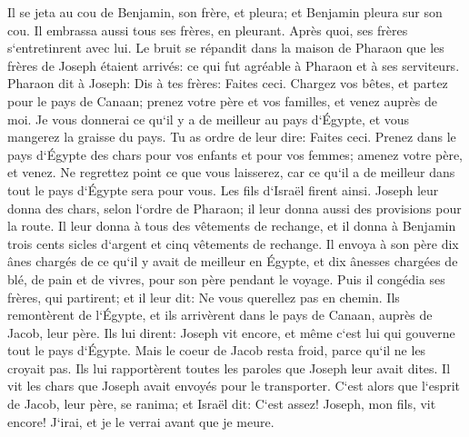 \verse Il se jeta au cou de Benjamin, son frère, et pleura; et Benjamin pleura sur son cou. 
\verse Il embrassa aussi tous ses frères, en pleurant. Après quoi, ses frères s`entretinrent avec lui. 
\verse Le bruit se répandit dans la maison de Pharaon que les frères de Joseph étaient arrivés: ce qui fut agréable à Pharaon et à ses serviteurs. 
\verse Pharaon dit à Joseph: Dis à tes frères: Faites ceci. Chargez vos bêtes, et partez pour le pays de Canaan; 
\verse prenez votre père et vos familles, et venez auprès de moi. Je vous donnerai ce qu`il y a de meilleur au pays d`Égypte, et vous mangerez la graisse du pays. 
\verse Tu as ordre de leur dire: Faites ceci. Prenez dans le pays d`Égypte des chars pour vos enfants et pour vos femmes; amenez votre père, et venez. 
\verse Ne regrettez point ce que vous laisserez, car ce qu`il a de meilleur dans tout le pays d`Égypte sera pour vous. 
\verse Les fils d`Israël firent ainsi. Joseph leur donna des chars, selon l`ordre de Pharaon; il leur donna aussi des provisions pour la route. 
\verse Il leur donna à tous des vêtements de rechange, et il donna à Benjamin trois cents sicles d`argent et cinq vêtements de rechange. 
\verse Il envoya à son père dix ânes chargés de ce qu`il y avait de meilleur en Égypte, et dix ânesses chargées de blé, de pain et de vivres, pour son père pendant le voyage. 
\verse Puis il congédia ses frères, qui partirent; et il leur dit: Ne vous querellez pas en chemin. 
\verse Ils remontèrent de l`Égypte, et ils arrivèrent dans le pays de Canaan, auprès de Jacob, leur père. 
\verse Ils lui dirent: Joseph vit encore, et même c`est lui qui gouverne tout le pays d`Égypte. Mais le coeur de Jacob resta froid, parce qu`il ne les croyait pas. 
\verse Ils lui rapportèrent toutes les paroles que Joseph leur avait dites. Il vit les chars que Joseph avait envoyés pour le transporter. C`est alors que l`esprit de Jacob, leur père, se ranima; 
\verse et Israël dit: C`est assez! Joseph, mon fils, vit encore! J`irai, et je le verrai avant que je meure. 

